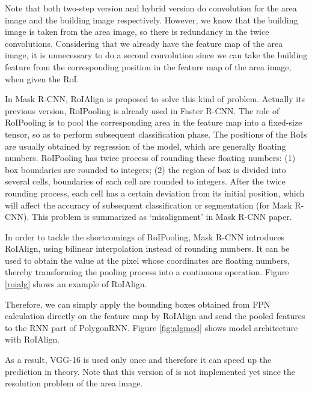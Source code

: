 Note that both two-step version and hybrid version do convolution for the area image and the building image respectively. However, we know that the building image is taken from the area image, so there is redundancy in the twice convolutions. Considering that we already have the feature map of the area image, it is unnecessary to do a second convolution since we can take the building feature from the corresponding position in the feature map of the area image, when given the RoI.

In Mask R-CNN, RoIAlign is proposed to solve this kind of problem. Actually its previous version, RoIPooling is already used in Faster R-CNN. The role of RoIPooling is to pool the corresponding area in the feature map into a fixed-size tensor, so as to perform subsequent classification phase. The positions of the RoIs are usually obtained by regression of the model, which are generally floating numbers. RoIPooling has twice process of rounding these floating numbers: (1) box boundaries are rounded to integers; (2) the region of box is divided into several cells, boundaries of each cell are rounded to integers. After the twice rounding process, each cell has a certain deviation from its initial position, which will affect the accuracy of subsequent classification or segmentation (for Mask R-CNN). This problem is summarized as `misalignment' in Mask R-CNN paper.

In order to tackle the shortcomings of RoIPooling, Mask R-CNN introduces RoIAlign, using bilinear interpolation instead of rounding numbers. It can be used to obtain the value at the pixel whose coordinates are floating numbers, thereby transforming the pooling process into a continuous operation. Figure \ref{roialg} shows an example of RoIAlign.



Therefore, we can simply apply the bounding boxes obtained from FPN calculation directly on the feature map by RoIAlign and send the pooled features to the RNN part of PolygonRNN. Figure \ref{fig:algmod} shows \modelnameshort model architecture with RoIAlign.



As a result, VGG-16 is used only once and therefore it can speed up the prediction in theory. Note that this version of \modelnameshort is not implemented yet since the resolution problem of the area image.


